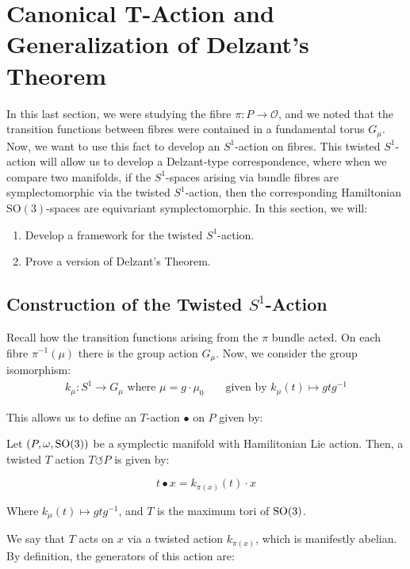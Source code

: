 \section{Canonical T-Action and Generalization of Delzant's Theorem}

In this last section, we were studying the fibre  $\pi: P \to \mathcal{O}$, and we noted that the transition functions between fibres were contained in a fundamental torus $G_{\mu}$. Now, we want to use this fact to develop an $S^{1}$-action on fibres. This twisted $S^{1}$-action will allow us to develop a Delzant-type correspondence, where when we compare two manifolds, if the $S^{1}$-spaces arising via bundle fibres are symplectomorphic via the twisted $S^{1}$-action, then the corresponding Hamiltonian $\mathrm{SO}(3)$-spaces are equivariant symplectomorphic. In this section, we will:
\begin{enumerate}
    \item Develop a framework for the twisted $S^{1}$-action.
    \item Prove a version of Delzant's Theorem.
\end{enumerate}
\subsection{Construction of the Twisted $S^1$-Action}
Recall how the transition functions arising from the $\pi$ bundle acted. On each fibre $\pi^{-1}(\mu)$ there is the group action $G_{\mu}$. Now, we consider the group isomorphism:
\begin{align}
k_{\mu}: S^{1} \to G_{\mu} \text{ where } \mu = g \cdot \mu_{0} && \text{ given by } k_{\mu}(t) \mapsto gtg^{-1} 
\end{align}

\noindent This allows us to define an $T$-action $\bullet$ on $P$ given by: 

\begin{defn}[$T$-action on $P$]
Let $(P, \omega, \rm{SO}(3))$ be a symplectic manifold with Hamilitonian Lie action. Then, a twisted $T$ action $T \circlearrowleft P$ is given by:

\begin{equation}
t \bullet x = k_{\pi(x)}(t) \cdot x
\end{equation}

\noindent Where $k_{\mu}(t) \mapsto gtg^{-1}$, and $T$ is the maximum tori of $\rm{SO}(3)$.
\end{defn}

\begin{remark}
We say that $T$ acts on $x$ via a twisted action $k_{\pi(x)}$, which is manifestly abelian. By definition, the generators of this action are:
\end{remark}

